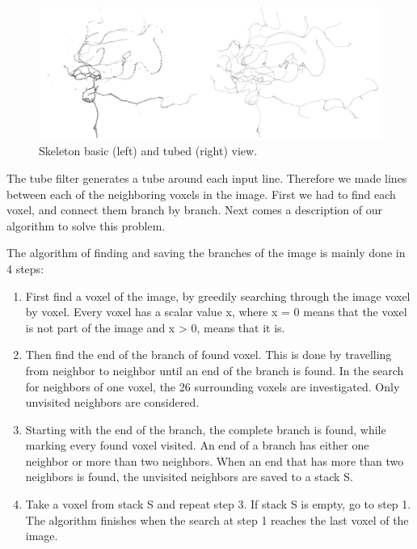 \begin{figure}
	\centering
	\includegraphics[scale=0.35]{fig/skeleton-basic-tubed}
	\caption{Skeleton basic (left) and tubed (right) view.}\label{fig:skeleton-basic-tubed}
\end{figure}

The tube filter generates a tube around each input line. Therefore we made lines between each of the neighboring voxels in the image. First we had to find each voxel, and connect them branch by branch. Next comes a description of our algorithm to solve this problem.

The algorithm of finding and saving the branches of the image is mainly done in 4 steps:
\begin{enumerate}
	\item First find a voxel of the image, by greedily searching through the image voxel by voxel. Every voxel has a scalar value x, where x = 0 means that the voxel is not part of the image and x > 0, means that it is. 

	\item Then find the end of the branch of found voxel. This is done by travelling from neighbor to neighbor until an end of the branch is found. In the search for neighbors of one voxel, the 26 surrounding voxels are investigated. Only unvisited neighbors are considered.

	\item Starting with the end of the branch, the complete branch is found, while marking every found voxel visited. An end of a branch has either one neighbor or more than two neighbors. When an end that has more than two neighbors is found, the unvisited neighbors are saved to a stack S.

	\item Take a voxel from stack S and repeat step 3. If stack S is empty, go to step 1. The algorithm finishes when the search at step 1 reaches the last voxel of the image.
\end{enumerate}

